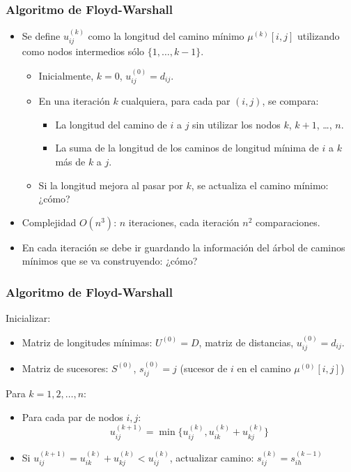 \documentclass[aspectratio=169]{beamer}
\begin{document}
\begin{frame}
	
	\frametitle{Algoritmo de Floyd-Warshall}
		\begin{itemize}\itemsep 5mm
		\item Se define $u_{ij}^{(k)}$ como la longitud del camino m\'inimo $\mu^{(k)}[i,j]$ utilizando como nodos intermedios s\'olo $\{1,\dots,k-1\}$.
	\begin{itemize}\itemsep 3mm
		\item  Inicialmente, $k=0$,  $u_{ij}^{(0)}=d_{ij}$.
		\item En una iteración $k$ cualquiera, para cada par $(i,j)$, se compara:
		\begin{itemize}\itemsep 1mm
			\item La longitud del camino de $i$ a $j$ sin utilizar los nodos $k$, $k+1$, \dots, $n$.
			\item La suma de la longitud de los caminos de longitud m\'inima de $i$ a $k$ m\'as de $k$ a $j$.
		\end{itemize}
		\item Si la longitud mejora al pasar por $k$, se actualiza el camino m\'inimo: {\color{red} ¿cómo?}
	\end{itemize}
	\item Complejidad $O(n^3)$: $n$ iteraciones,  cada iteraci\'on $n^2$ comparaciones.
	\item En cada iteraci\'on se debe ir guardando la informaci\'on del \'arbol de caminos m\'inimos que se va construyendo: {\color{red} ¿cómo?}
	\end{itemize}
	
\end{frame}

\begin{frame}
	
	\frametitle{Algoritmo de Floyd-Warshall}
	
	 \noindent [Paso 0.] Inicializar:
      \begin{itemize}
        \item Matriz de longitudes mínimas: $U^{(0)}=D$, matriz de distancias, $u^{(0)}_{ij}=d_{ij}$.
        \item Matriz de {\color{red} sucesores}: $S^{(0)}$, $s^{(0)}_{ij}=j$ (sucesor de $i$ en el camino $\mu^{(0)}[i,j]$)
       \end{itemize}
        
		 \noindent [Paso 1.] Para $k=1,2,\dots,n$:
		\begin{itemize}\itemsep 3mm
		\item Para cada par de nodos $i,j$:
		 $$
		 u_{ij}^{(k+1)}=\min\bigl\{u_{ij}^{(k)}, u_{ik}^{(k)} + u_{kj}^{(k)}\bigr\}
		 $$
        \item Si $u_{ij}^{(k+1)}= u_{ik}^{(k)} + u_{kj}^{(k)}<u_{ij}^{(k)}$, actualizar camino: 
             {\color{red} $s^{(k)}_{ij}=s^{(k-1)}_{ih}$}              
         \end{itemize}          
	
\end{frame}
\end{document}
